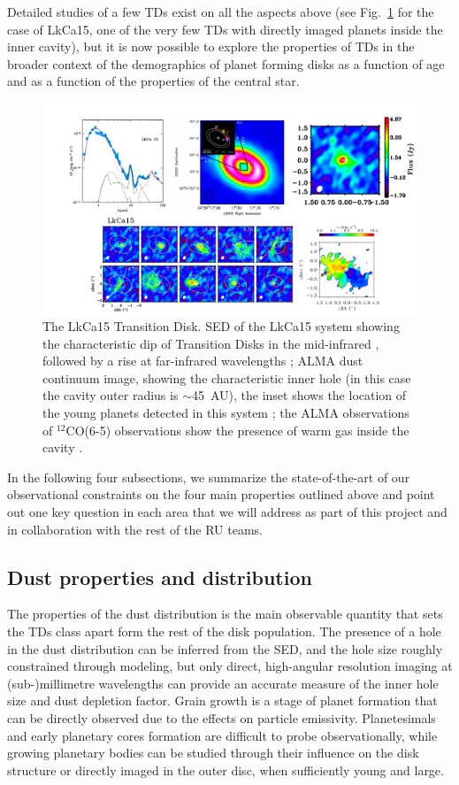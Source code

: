 \documentclass[10pt,fleqn,twoside]{article}
\begin{document}
Detailed studies of a few TDs exist on all the aspects above (see Fig.~\ref{f_examples} for the case of LkCa15, one of the very few TDs with directly imaged planets inside the inner cavity), but it is now possible to explore the properties of TDs in the broader context of the demographics of planet forming disks as a function of age and as a function of the properties of the central star.  
\begin{figure}
\centerline{\includegraphics[scale=0.5]{Figure_LkCa15.pdf}}
\caption{The LkCa15 Transition Disk.  SED of the LkCa15 system showing the characteristic dip
  of Transition Disks in the mid-infrared , followed by a rise at
  far-infrared wavelengths \citep{2011ApJ...728...49E}; ALMA dust continuum
  image, showing the characteristic inner hole (in this case the cavity
  outer radius is $\sim$45~AU), the inset shows the location of the young
  planets detected in this system \citep{2015Natur.527..342S}; the ALMA
  observations of $^{12}$CO(6-5) observations show the presence of warm gas
  inside the cavity \citep{2015A&A...579A.106V}.}
\label{f_examples}
\end{figure}

In the following four subsections, we summarize the state-of-the-art of our observational constraints on the four main properties outlined above and point out one key question in each area that we will address as part of this project and in collaboration with the rest of the RU teams.

\subsection{Dust properties and distribution} 
The properties of the dust distribution is the main observable quantity that sets the TDs class apart form the rest of the disk population. The presence of a hole in the dust distribution can be inferred from the SED, and the hole size roughly constrained through modeling, but only direct, high-angular resolution imaging at (sub-)millimetre wavelengths can provide an accurate measure of the inner hole size and dust depletion factor.
Grain growth is a stage of planet formation that can be directly observed due to the effects on particle emissivity. Planetesimals and early planetary cores formation are difficult to probe observationally, while growing planetary bodies can be studied through their influence on the disk structure or directly imaged in the outer disc, when sufficiently young and large.
\end{document}
